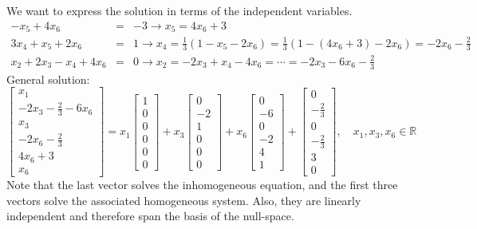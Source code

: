 \documentclass{article}
\begin{document}
We want to express the solution in terms of the independent variables.
\begin{eqnarray*}
  - x_5 + 4 x_6 & = & - 3 \rightarrow x_5 = 4 x_6 + 3\\
  3 x_4 + x_5 + 2 x_6 & = & 1 \rightarrow x_4 = \frac{1}{3} (1 - x_5 - 2 x_6)
  = \frac{1}{3} (1 - (4 x_6 + 3) - 2 x_6) = - 2 x_6 - \frac{2}{3}\\
  x_2 + 2 x_3 - x_4 + 4 x_6 & = & 0 \rightarrow x_2 = - 2 x_3 + x_4 - 4 x_6 =
  \cdots = - 2 x_3 - 6 x_6 - \frac{2}{3}
\end{eqnarray*}
General solution:
\[ \left[\begin{array}{c}
     x_1\\
     - 2 x_3 - \frac{2}{3} - 6 x_6\\
     x_3\\
     - 2 x_6 - \frac{2}{3}\\
     4 x_6 + 3\\
     x_6
   \end{array}\right] = x_1 \left[\begin{array}{c}
     1\\
     0\\
     0\\
     0\\
     0\\
     0
   \end{array}\right] + x_3 \left[\begin{array}{c}
     0\\
     - 2\\
     1\\
     0\\
     0\\
     0
   \end{array}\right] + x_6 \left[\begin{array}{c}
     0\\
     - 6\\
     0\\
     - 2\\
     4\\
     1
   \end{array}\right] + \left[\begin{array}{c}
     0\\
     - \frac{2}{3}\\
     0\\
     - \frac{2}{3}\\
     3\\
     0
   \end{array}\right], \quad x_1, x_3, x_6 \in \mathbb{R} \]
Note that the last vector solves the inhomogeneous equation, and the first
three vectors solve the associated homogeneous system. Also, they are linearly
independent and therefore span the basis of the null-space.
\end{document}
